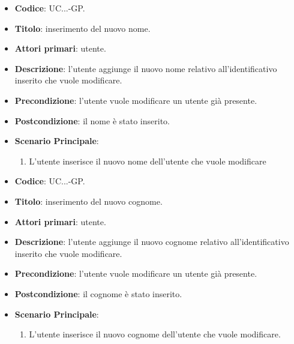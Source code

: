 				
				\begin{itemize}
					\item \textbf{Codice}: UC\theuccount.\thesubuccount.\thesubsubuccount.\thesubsubsubuccount-GP.
					\item \textbf{Titolo}: inserimento del nuovo nome.
					\item \textbf{Attori primari}: utente.
					\item \textbf{Descrizione}: l'utente aggiunge il nuovo nome relativo all'identificativo inserito che vuole modificare.
					\item \textbf{Precondizione}: l'utente vuole modificare un utente già presente.
					\item \textbf{Postcondizione}: il nome è stato inserito.
					\item \textbf{Scenario Principale}:
					\begin{enumerate}
						\item L'utente inserisce il nuovo nome dell'utente che vuole modificare
					\end{enumerate}
				\end{itemize}
			
				
				\begin{itemize}
					\item \textbf{Codice}: UC\theuccount.\thesubuccount.\thesubsubuccount.\thesubsubsubuccount-GP.
					\item \textbf{Titolo}: inserimento del nuovo cognome.
					\item \textbf{Attori primari}: utente.
					\item \textbf{Descrizione}: l'utente aggiunge il nuovo cognome relativo all'identificativo inserito che vuole modificare.
					\item \textbf{Precondizione}: l'utente vuole modificare un utente già presente.
					\item \textbf{Postcondizione}: il cognome è stato inserito.
					\item \textbf{Scenario Principale}:
					\begin{enumerate}
						\item L'utente inserisce il nuovo cognome dell'utente che vuole modificare.
					\end{enumerate}
				\end{itemize}
			
